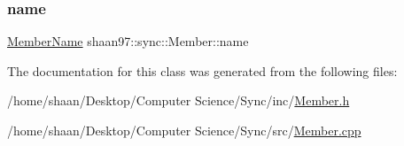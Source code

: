 \subsubsection{\texorpdfstring{name}{name}}
{\footnotesize\ttfamily \hyperlink{namespaceshaan97_1_1sync_af59c2c9185f7cde547b79fbe0bf8ec71}{Member\+Name} shaan97\+::sync\+::\+Member\+::name\hspace{0.3cm}{\ttfamily [protected]}}



The documentation for this class was generated from the following files\+:\begin{DoxyCompactItemize}
\item 
/home/shaan/\+Desktop/\+Computer Science/\+Sync/inc/\hyperlink{_member_8h}{Member.\+h}\item 
/home/shaan/\+Desktop/\+Computer Science/\+Sync/src/\hyperlink{_member_8cpp}{Member.\+cpp}\end{DoxyCompactItemize}
